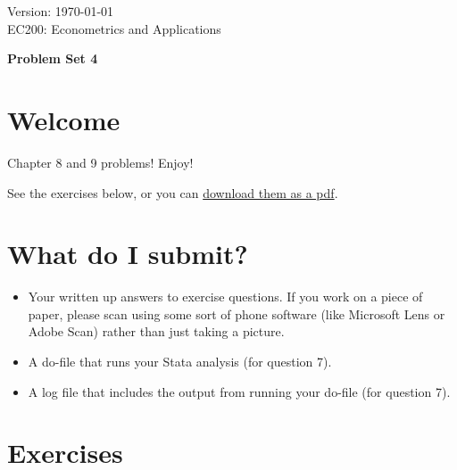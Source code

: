 \documentclass[11pt]{article}
\begin{document}
\thispagestyle{plain}
\singlespacing


Version: \today \hfill \\
EC200: Econometrics and Applications
\begin{center}
\Large{\textbf{Problem Set 4}}\\
\end{center}
\bigskip


\hypertarget{welcome}{%
\section*{Welcome}\label{welcome}}

Chapter 8 and 9 problems! Enjoy!

See the exercises below, or you can \href{https://ec200f22.netlify.app/assignment/04-ps.pdf}{download them as
a pdf}.

\hypertarget{what-do-i-submit}{%
\section*{What do I submit?}\label{what-do-i-submit}}

\begin{itemize}
\item
  Your written up answers to exercise questions. If you work on a piece
  of paper, please scan using some sort of phone software (like
  Microsoft Lens or Adobe Scan) rather than just taking a picture.
\item
  A do-file that runs your Stata analysis (for question 7).
\item
  A log file that includes the output from running your do-file (for
  question 7).
\end{itemize}

\hypertarget{exercises}{%
\section*{Exercises}\label{exercises}}
\end{document}
